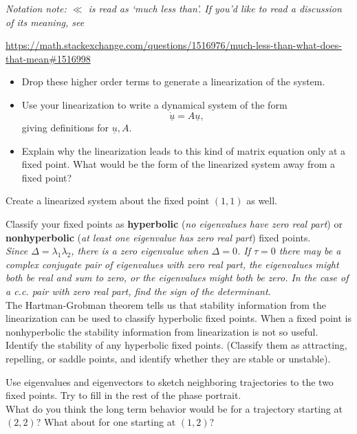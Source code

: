 \documentclass[12pt,letterpaper,noanswers]{exam}
\begin{document}
\begin{questions}
\begin{parts}
\emph{Notation note: $\ll$ is read as `much less than'.  If you'd like to read a discussion of its meaning, see}

\small{\url{https://math.stackexchange.com/questions/1516976/much-less-than-what-does-that-mean#1516998}}
\begin{itemize}
\item Drop these higher order terms to generate a linearization of the system.  
\item Use your linearization to write a dynamical system of the form \[\dot{\underline{u}} = A \underline{u},\] giving definitions for $\underline{u}, A$. \\
\item Explain why the linearization leads to this kind of matrix equation only at a fixed point.  What would be the form of the linearized system away from a fixed point?
\end{itemize}

\item Create a linearized system about the fixed point $(1,1)$ as well.
\item Classify your fixed points as  \textbf{hyperbolic} (\emph{no eigenvalues have zero real part}) or \textbf{nonhyperbolic} 
 (\emph{at least one eigenvalue has zero real part}) fixed points.  \\ 
 
 \emph{Since $\Delta = \lambda_1\lambda_2$, there is a zero eigenvalue when $\Delta = 0$.  If $\tau = 0$ there may be a complex conjugate pair of eigenvalues with zero real part, the eigenvalues might both be real and sum to zero, or the eigenvalues might both be zero.  In the case of a c.c. pair with zero real part, find the sign of the determinant.} \\
 
The Hartman-Grobman theorem tells us that stability information from the linearization can be used to classify hyperbolic fixed points.  When a fixed point is nonhyperbolic the stability information from linearization is not so useful.
 \\

Identify the stability of any hyperbolic fixed points.  (Classify them as attracting, repelling, or saddle points, and identify whether they are stable or unstable).
 
  \item Use eigenvalues and eigenvectors to sketch neighboring trajectories to the two fixed points.  Try to fill in the rest of the phase portrait.  \\
  
  What do you think the long term behavior would be for a trajectory starting at $(2,2)$?  What about for one starting at $(1,2)$?

 \end{parts}

\end{questions}
\end{document}
